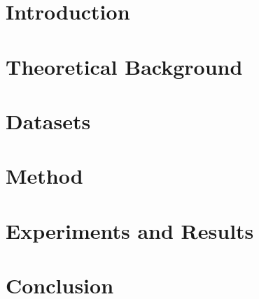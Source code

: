 \documentclass{ctuthesis}
\begin{document}
\maketitle

\chapter{Introduction}\label{chap:intro}


\chapter{Theoretical Background}\label{chap:background}






\chapter{Datasets}\label{chap:datasets}





\chapter{Method}\label{chap:method}







\chapter{Experiments and Results}\label{chap:experiments}





\chapter{Conclusion}\label{chap:conclusion}


\end{document}
